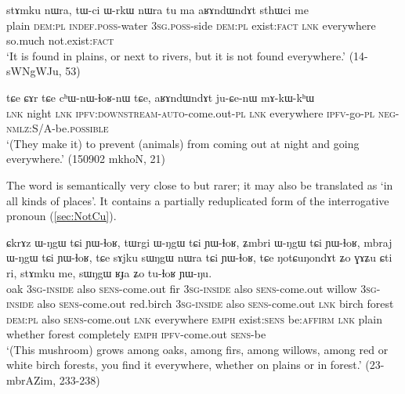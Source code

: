 \begin{exe}
\ex \label{ex:aRAndWndAt.me}
\gll stɤmku nɯra, tɯ-ci ɯ-rkɯ nɯra tu ma aʁɤndɯndɤt sthɯci me \\
plain \textsc{dem:pl} \textsc{indef.poss}-water \textsc{3sg.poss}-side  \textsc{dem:pl} exist:\textsc{fact} \textsc{lnk} everywhere so.much not.exist:\textsc{fact} \\
\glt `It is found in plains, or next to rivers, but it is not found everywhere.' (14-sWNgWJu, 53)
\end{exe} 

\begin{exe}
\ex \label{ex:aRAndWndAt.juCenW}
\gll tɕe ɕɤr tɕe cʰɯ-nɯ-ɬoʁ-nɯ tɕe, aʁɤndɯndɤt ju-ɕe-nɯ mɤ-kɯ-kʰɯ \\
\textsc{lnk} night \textsc{lnk} \textsc{ipfv:downstream-auto}-come.out-\textsc{pl} \textsc{lnk} everywhere \textsc{ipfv}-go-\textsc{pl} \textsc{neg}-\textsc{nmlz}:S/A-be.\textsc{possible} \\
\glt `(They make it) to prevent (animals) from coming out at night and going everywhere.' (150902 mkhoN, 21)
\end{exe} 

The word   is semantically very close to  but rarer; it may also be translated as `in all kinds of places'. It contains a partially reduplicated form of the interrogative pronoun  (\ref{sec:NotCu}).

 \begin{exe}
\ex \label{ex:NotCuNondAt}
\gll ɕkrɤz ɯ-ŋgɯ tɕi ɲɯ-ɬoʁ, tɯrgi ɯ-ŋgɯ tɕi ɲɯ-ɬoʁ, ʑmbri ɯ-ŋgɯ tɕi ɲɯ-ɬoʁ,  mbraj ɯ-ŋgɯ tɕi ɲɯ-ɬoʁ, tɕe sɤjku sɯŋgɯ nɯra tɕi ɲɯ-ɬoʁ, tɕe ŋotɕuŋondɤt ʑo ɣɤʑu ɕti ri, stɤmku me, sɯŋgɯ ʁɟa ʑo tu-ɬoʁ ɲɯ-ŋu. \\
oak \textsc{3sg-inside} also \textsc{sens}-come.out fir \textsc{3sg-inside} also \textsc{sens}-come.out willow \textsc{3sg-inside} also \textsc{sens}-come.out red.birch \textsc{3sg-inside} also \textsc{sens}-come.out \textsc{lnk} birch  forest \textsc{dem:pl} also \textsc{sens}-come.out \textsc{lnk} everywhere \textsc{emph} exist:\textsc{sens} be:\textsc{affirm}  \textsc{lnk} plain whether  forest completely \textsc{emph} \textsc{ipfv}-come.out \textsc{sens}-be \\
\glt `(This mushroom) grows among oaks, among firs, among willows, among red or white birch forests, you find it everywhere, whether on plains or in forest.' (23-mbrAZim, 233-238)
\end{exe} 

